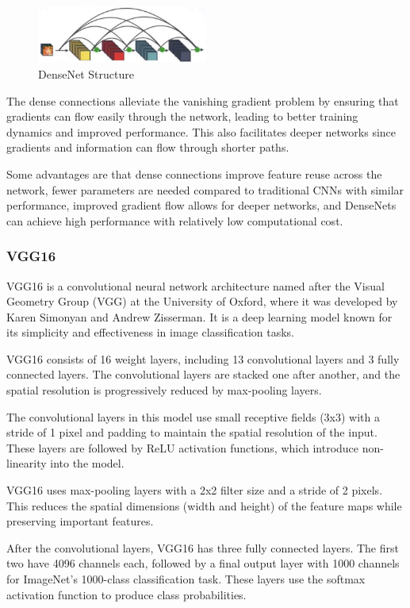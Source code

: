\documentclass[conference]{IEEEtran}
\begin{document}
\begin{figure}[H]
\centering
    \includegraphics[width=0.5\textwidth]{images/DenseNetStructure.png}
    \caption{DenseNet Structure}
\end{figure}

The dense connections alleviate the vanishing gradient problem by ensuring that gradients can flow easily through the network, leading to better training dynamics and improved performance. This also facilitates deeper networks since gradients and information can flow through shorter paths.

Some advantages are that dense connections improve feature reuse across the network, fewer parameters are needed compared to traditional CNNs with similar performance, improved gradient flow allows for deeper networks, and DenseNets can achieve high performance with relatively low computational cost.

\subsubsection{VGG16}

VGG16 is a convolutional neural network architecture named after the Visual Geometry Group (VGG) at the University of Oxford, where it was developed by Karen Simonyan and Andrew Zisserman. It is a deep learning model known for its simplicity and effectiveness in image classification tasks.

VGG16 consists of 16 weight layers, including 13 convolutional layers and 3 fully connected layers. The convolutional layers are stacked one after another, and the spatial resolution is progressively reduced by max-pooling layers.

The convolutional layers in this model use small receptive fields (3x3) with a stride of 1 pixel and padding to maintain the spatial resolution of the input. These layers are followed by ReLU activation functions, which introduce non-linearity into the model.

VGG16 uses max-pooling layers with a 2x2 filter size and a stride of 2 pixels. This reduces the spatial dimensions (width and height) of the feature maps while preserving important features.

After the convolutional layers, VGG16 has three fully connected layers. The first two have 4096 channels each, followed by a final output layer with 1000 channels for ImageNet's 1000-class classification task. These layers use the softmax activation function to produce class probabilities.
\end{document}
